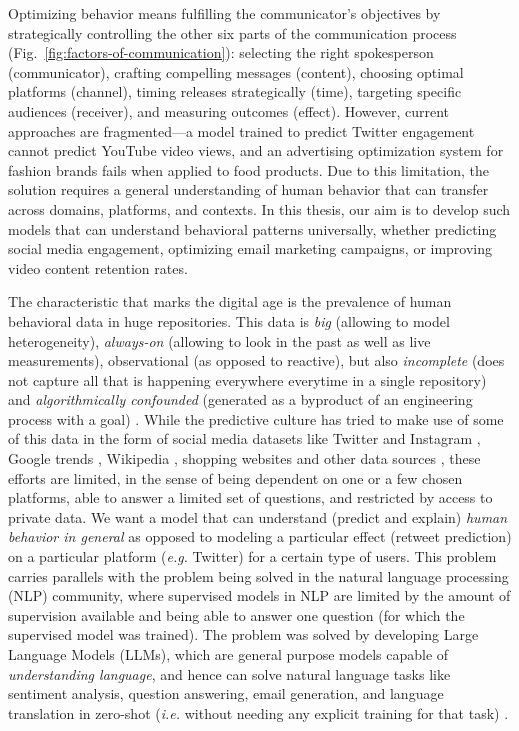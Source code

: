 Optimizing behavior means fulfilling the communicator's objectives by strategically controlling the other six parts of the communication process (Fig.~\ref{fig:factors-of-communication}): selecting the right spokesperson (communicator), crafting compelling messages (content), choosing optimal platforms (channel), timing releases strategically (time), targeting specific audiences (receiver), and measuring outcomes (effect). However, current approaches are fragmented—a model trained to predict Twitter engagement cannot predict YouTube video views, and an advertising optimization system for fashion brands fails when applied to food products. Due to this limitation, the solution requires a general understanding of human behavior that can transfer across domains, platforms, and contexts. In this thesis, our aim is to develop such models that can understand behavioral patterns universally, whether predicting social media engagement, optimizing email marketing campaigns, or improving video content retention rates.


The characteristic that marks the digital age is the prevalence of human behavioral data in huge repositories. This data is \textit{big} (allowing to model heterogeneity), \textit{always-on} (allowing to look in the past as well as live measurements), observational (as opposed to reactive), but also \textit{incomplete} (does not capture all that is happening everywhere everytime in a single repository) and \textit{algorithmically confounded} (generated as a byproduct of an engineering process with a goal) \cite{salganik2019bit}. While the predictive culture has tried to make use of some of this data in the form of social media datasets like Twitter \cite{tumasjan2010predicting,asur2010predicting} and Instagram \cite{kim2020multimodal}, Google trends \cite{choi2012predicting,carriere2013nowcasting}, Wikipedia \cite{generous2014global,de2021general,mestyan2013early}, shopping websites \cite{krumme2013predictability,de2015unique} and other data sources \cite{brockmann2006scaling,song2010limits,miritello2013limited}, these efforts are limited, in the sense of being dependent on one or a few chosen platforms, able to answer a limited set of questions, and restricted by access to private data. We want a model that can understand (predict and explain) \textit{human behavior in general} as opposed to modeling a particular effect (retweet prediction) on a particular platform (\textit{e.g.} Twitter) for a certain type of users.
This problem carries parallels with the problem being solved in the natural language processing (NLP) community, where supervised models in NLP are limited by the amount of supervision available and being able to answer one question (for which the supervised model was trained). The problem was solved by developing Large Language Models (LLMs), which are general purpose models capable of \textit{understanding language}, and hence can solve natural language tasks like sentiment analysis, question answering, email generation, and language translation in zero-shot (\textit{i.e.} without needing any explicit training for that task) \cite{devlin2018bert,brown2020language,radford2018improving,raffel2020exploring,radford2019language}.




